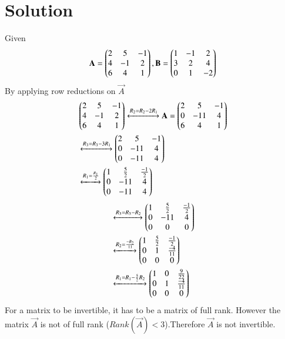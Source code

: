 \documentclass[journal,12pt,twocolumn]{IEEEtran}
\begin{document}
\section{\textbf{Solution}}Given 
\begin{align}
\mathbf{A}=\begin{pmatrix}2&5&-1\\4&-1&2\\6&4&1\end{pmatrix},
\mathbf{B}=\begin{pmatrix}1&-1&2\\3&2&4\\0&1&-2\end{pmatrix}
\end{align}
 By applying row reductions on $\vec{A}$
 \begin{align}
&\begin{pmatrix}2&5&-1\\4&-1&2\\6&4&1\end{pmatrix}\xleftrightarrow{R_2=R_2-2R_1}\mathbf{A}=\begin{pmatrix}2&5&-1\\0&-11&4\\6&4&1\end{pmatrix}\\
&\xleftrightarrow{R_3=R_3-3R_1}\begin{pmatrix}2&5&-1\\0&-11&4\\0&-11&4\end{pmatrix}\\
&\xleftrightarrow{R_1=\frac{R_1}{2}}\begin{pmatrix}1&\frac{5}{2}&\frac{-1}{2}\\0&-11&4\\0&-11&4\end{pmatrix}
\end{align}
\begin{align}
&\xleftrightarrow{R_3=R_3-R_2}\begin{pmatrix}1&\frac{5}{2}&\frac{-1}{2}\\0&-11&4\\0&0&0\end{pmatrix}\\
&\xleftrightarrow{R_2=\frac{-R_2}{11}}\begin{pmatrix}1&\frac{5}{2}&\frac{-1}{2}\\0&1&\frac{-4}{11}\\0&0&0\end{pmatrix}\\
&\xleftrightarrow{R_1=R_1-\frac{5}{2}R_2}\begin{pmatrix}1&0&\frac{9}{22}\\0&1&\frac{-4}{11}\\0&0&0\end{pmatrix}
\end{align}
For a matrix to be invertible, it has to be a matrix of full rank. However the matrix $\vec{A}$ is not of full rank ($Rank(\vec{A})<3$).Therefore $\vec{A}$ is not invertible.
\end{document}
